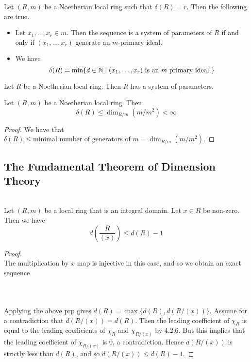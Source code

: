 \documentclass[a4paper]{article}
\begin{document}
\begin{lmm}{}{} Let $(R,m)$ be a Noetherian local ring such that $\delta(R)=r$. Then the following are true. 
\begin{itemize}
\item Let $x_1,\dots,x_r\in m$. Then the sequence is a system of parameters of $R$ if and only if $(x_1,\dots,x_r)$ generate an $m$-primary ideal. 
\item We have $$\delta(R)=\min\{d\in\mathbb{N}\;|\;(x_1,\dots,x_r)\text{ is an }m\text{ primary ideal }\}$$
\end{itemize}
\end{lmm}

\begin{lmm}{}{} Let $R$ be a Noetherian local ring. Then $R$ has a system of parameters. 
\end{lmm}

\begin{prp}{}{} Let $(R,m)$ be a Noetherian local ring. Then $$\delta(R)\leq\dim_{R/m}(m/m^2)<\infty$$ 
\begin{proof}
We have that $\delta(R)\leq\text{minimal number of generators of }m=\dim_{R/m}(m/m^2)$. 
\end{proof}
\end{prp}

\subsection{The Fundamental Theorem of Dimension Theory}
\begin{lmm}{}{}\\
Let $(R,m)$ be a local ring that is an integral domain. Let $x\in R$ be non-zero. Then we have $$d\left(\frac{R}{(x)}\right)\leq d(R)-1$$ 
\begin{proof}\\
The multiplication by $x$ map is injective in this case, and so we obtain an exact sequence \\~\\
\\~\\
Applying the above prp gives $d(R)=\max\{d(R),d(R/(x))\}$. Assume for a contradiction that $d(R/(x))=d(R)$. Then the leading coefficient of $\chi_R$ is equal to the leading coefficients of $\chi_R$ and $\chi_{R/(x)}$ by 4.2.6. But this implies that the leading coefficient of $\chi_{R/(x)}$ is $0$, a contradiction. Hence $d(R/(x))$ is strictly less than $d(R)$, and so $d(R/(x))\leq d(R)-1$. 
\end{proof}
\end{lmm}
\end{document}
